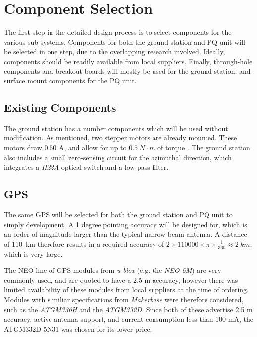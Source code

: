 \graphicspath{{./figures}}

\section{Component Selection}
The first step in the detailed design process is to select components for the various sub-systems. Components for both the ground station and PQ unit will be selected in one step, due to the overlapping research involved. Ideally, components should be readily available from local suppliers. Finally, through-hole components and breakout boards will mostly be used for the ground station, and surface mount components for the PQ unit.

\subsection{Existing Components}
The ground station has a number components which will be used without modification. As mentioned, two stepper motors are already mounted. These motors draw 0.50 A, and allow for up to $\SI{0.5}{N \cdot m}$ of torque \cite{datasheet-4118}. The ground station also includes a small zero-sensing circuit for the azimuthal direction, which integrates a \textit{H22A} optical switch \cite{datasheet-H22A1} and a low-pass filter.

\subsection{GPS}\label{sec:components_gps}
The same GPS will be selected for both the ground station and PQ unit to simply development. A 1 degree pointing accuracy will be designed for, which is an order of magnitude larger than the typical narrow-beam antenna. A distance of \SI{110}{km} therefore results in a required accuracy of $2 \times 110 000 \times \pi \times \frac{1}{360} \approx \SI{2}{km}$, which is very large.

The NEO line of GPS modules from \textit{u-blox} (e.g. the \textit{NEO-6M}) are very commonly used, and are quoted to have a 2.5 m accuracy, however there was limited availability of these modules from local suppliers at the time of ordering. Modules with similiar specifications from \textit{Makerbase} were therefore considered, such as the \textit{ATGM336H} and the \textit{ATGM332D}. Since both of these advertise 2.5 m accuracy, active antenna support, and current consumption less than 100 mA, the ATGM332D-5N31 was chosen for its lower price.

